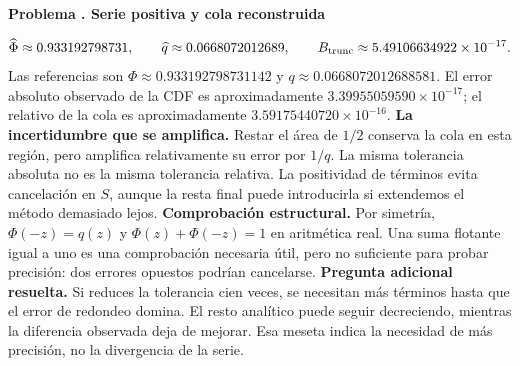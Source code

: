 \documentclass[11pt,a4paper]{article}
\theoremstyle{definition}
\newcounter{problema}
\newenvironment{resuelto}[1]{\refstepcounter{problema}\par\medskip\Needspace{6\baselineskip}\textbf{Problema \theproblema. #1}\par}{\par\medskip}
\begin{document}
\begin{resuelto}{Serie positiva y cola reconstruida}
\[\widehat\Phi\approx0.933192798731,\qquad \widehat q\approx0.0668072012689,\qquad B_{\rm trunc}\approx5.49106634922\times10^{-17}.
\]
Las referencias son $\Phi\approx0.933192798731142$ y $q\approx0.0668072012688581$. El error absoluto observado de la CDF es aproximadamente $3.39955059590\times10^{-17}$; el relativo de la cola es aproximadamente $3.59175440720\times10^{-16}$.
\textbf{La incertidumbre que se amplifica.} Restar el área de $1/2$ conserva la cola en esta región, pero amplifica relativamente su error por $1/q$. La misma tolerancia absoluta no es la misma tolerancia relativa. La positividad de términos evita cancelación en $S$, aunque la resta final puede introducirla si extendemos el método demasiado lejos.
\textbf{Comprobación estructural.} Por simetría, $\Phi(-z)=q(z)$ y $\Phi(z)+\Phi(-z)=1$ en aritmética real. Una suma flotante igual a uno es una comprobación necesaria útil, pero no suficiente para probar precisión: dos errores opuestos podrían cancelarse.
\textbf{Pregunta adicional resuelta.} Si reduces la tolerancia cien veces, se necesitan más términos hasta que el error de redondeo domina. El resto analítico puede seguir decreciendo, mientras la diferencia observada deja de mejorar. Esa meseta indica la necesidad de más precisión, no la divergencia de la serie.
\end{resuelto}
\end{document}
